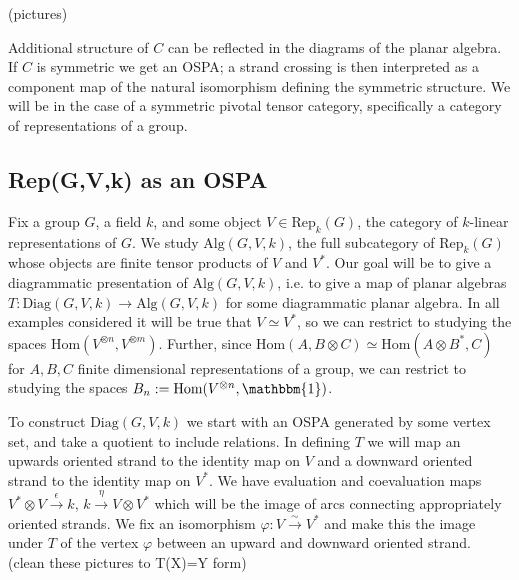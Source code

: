 \documentclass[11pt]{article} %
\begin{document}
(pictures)

Additional structure of $C$ can be reflected in the diagrams of the planar algebra. If $C$ is symmetric we get an OSPA; a strand crossing is then interpreted as a component map of the natural isomorphism defining the symmetric structure. We will be in the case of a symmetric pivotal tensor category, specifically a category of representations of a group.

\subsection{Rep(G,V,k) as an OSPA}
Fix a group $G$, a field $k$, and some object $V\in \text{Rep}_k(G)$, the category of $k$-linear representations of $G$. We study $\text{Alg}(G,V,k)$, the full subcategory of $\text{Rep}_k(G)$ whose objects are finite tensor products of $V$ and $V^{\ast}$. Our goal will be to give a diagrammatic presentation of $\text{Alg}(G,V,k)$, i.e. to give a map of planar algebras $T:\text{Diag}(G,V,k) \rightarrow \text{Alg}(G,V,k)$ for some diagrammatic planar algebra. In all examples considered it will be true that $V \simeq V^{\ast}$, so we can restrict to studying the spaces $\text{Hom}(V^{\otimes n},V^{\otimes m})$. Further, since $\text{Hom}(A, B \otimes C) \simeq \text{Hom}(A\otimes B^{\ast},C)$ for $A,B,C$ finite dimensional representations of a group, we can restrict to studying the spaces $B_n := \text{Hom}(V^{\otimes n}, \mathbbm{1})$.

To construct $\text{Diag}(G,V,k)$ we start with an OSPA generated by some vertex set, and take a quotient to include relations. In defining $T$ we will map an upwards oriented strand to the identity map on $V$ and a downward oriented strand to the identity map on $V^{\ast}$. We have evaluation and coevaluation maps $V^{\ast} \otimes V \xrightarrow{\epsilon} k$, $k \xrightarrow{\eta} V \otimes V^{\ast}$ which will be the image of arcs connecting appropriately oriented strands. We fix an isomorphism $\varphi:V \xrightarrow{\sim} V^{\ast}$ and make this the image under $T$ of the vertex $\varphi$ between an upward and downward oriented strand. (clean these pictures to T(X)=Y form)
\end{document}
